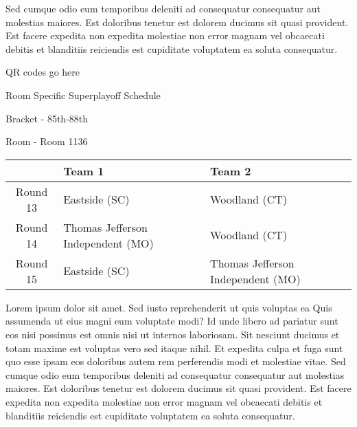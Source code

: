 \documentclass{article}%
\begin{document}
\newline%
Sed cumque odio eum temporibus deleniti ad consequatur consequatur aut molestias maiores. Est doloribus tenetur est dolorem ducimus sit quasi provident. Est facere expedita non expedita molestiae non error magnam vel obcaecati debitis et blanditiis reiciendis est cupiditate voluptatem ea soluta consequatur.%
\vspace*{140pt}%
\begin{center}%
\begin{Huge}%
QR codes go here%
\end{Huge}%
\end{center}%
\newpage%
\begin{center}%
\begin{Huge}%
Room Specific Superplayoff Schedule%
\end{Huge}%
\vspace*{8pt}%
\linebreak%
\begin{Large}%
Bracket {-} 85th{-}88th%
\end{Large}%
\vspace*{8pt}%
\linebreak%
\vspace*{8pt}%
\begin{Large}%
Room {-} Room 1136%
\end{Large}%
\end{center}%
%
\begin{tabularx}{\textwidth}{|c|Y|Y|}%
\hline%
&Team 1&Team 2\\%
\hline%
Round 13&Eastside (SC)&Woodland (CT)\\%
Round 14&Thomas Jefferson Independent (MO)&Woodland (CT)\\%
Round 15&Eastside (SC)&Thomas Jefferson Independent (MO)\\%
\hline%
\end{tabularx}%
\vspace*{8pt}%
\newline%
Lorem ipsum dolor sit amet. Sed iusto reprehenderit ut quis voluptas ea Quis assumenda ut eius magni eum voluptate modi? Id unde libero ad pariatur sunt eos nisi possimus est omnis nisi ut internos laboriosam. Sit nesciunt ducimus et totam maxime est voluptas vero sed itaque nihil. Et expedita culpa et fuga sunt quo esse ipsam eos doloribus autem rem perferendis modi et molestiae vitae.\newline%
\newline%
Sed cumque odio eum temporibus deleniti ad consequatur consequatur aut molestias maiores. Est doloribus tenetur est dolorem ducimus sit quasi provident. Est facere expedita non expedita molestiae non error magnam vel obcaecati debitis et blanditiis reiciendis est cupiditate voluptatem ea soluta consequatur.%
\end{document}
